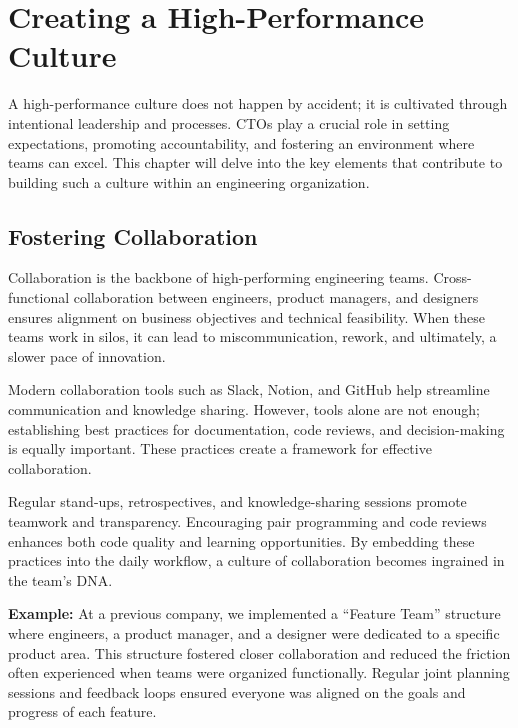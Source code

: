 
\section{Creating a High-Performance Culture}

A high-performance culture does not happen by accident; it is cultivated through intentional leadership and processes. CTOs play a crucial role in setting expectations, promoting accountability, and fostering an environment where teams can excel. This chapter will delve into the key elements that contribute to building such a culture within an engineering organization.

\subsection{Fostering Collaboration}

Collaboration is the backbone of high-performing engineering teams. Cross-functional collaboration between engineers, product managers, and designers ensures alignment on business objectives and technical feasibility. When these teams work in silos, it can lead to miscommunication, rework, and ultimately, a slower pace of innovation.

Modern collaboration tools such as Slack, Notion, and GitHub help streamline communication and knowledge sharing. However, tools alone are not enough; establishing best practices for documentation, code reviews, and decision-making is equally important. These practices create a framework for effective collaboration.

Regular stand-ups, retrospectives, and knowledge-sharing sessions promote teamwork and transparency. Encouraging pair programming and code reviews enhances both code quality and learning opportunities. By embedding these practices into the daily workflow, a culture of collaboration becomes ingrained in the team's DNA.

\textbf{Example:} At a previous company, we implemented a ``Feature Team'' structure where engineers, a product manager, and a designer were dedicated to a specific product area. This structure fostered closer collaboration and reduced the friction often experienced when teams were organized functionally. Regular joint planning sessions and feedback loops ensured everyone was aligned on the goals and progress of each feature.

